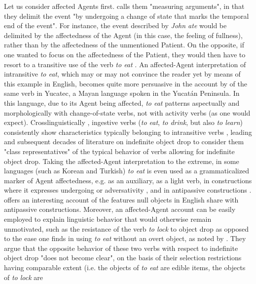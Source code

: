 Let us consider affected Agents first. \textcite[158]{tenny1994aspectual} calls them "measuring arguments", in that they delimit the event "by undergoing a change of state that marks the temporal end of the event". For instance, the event described by \textit{John ate} would be delimited by the affectedness of the Agent (in this case, the feeling of fullness), rather than by the affectedness of the unmentioned Patient. On the opposite, if one wanted to focus on the affectedness of the Patient, they would then have to resort to a transitive use of the verb \textit{to eat} \parencite[80]{Naess2007}. An affected-Agent interpretation of intransitive \textit{to eat}, which may or may not convince the reader yet by means of this example in English, becomes quite more persuasive in the account by \textcite[61-63]{Naess2007} of the same verb in Yucatec, a Mayan language spoken in the Yucatán Peninsula. In this language, due to its Agent being affected, \textit{to eat} patterns aspectually and morphologically with change-of-state verbs, not with activity verbs (as one would expect). Crosslinguistically \parencite[126]{Naess2007}, ingestive verbs (\textit{to eat}, \textit{to drink}, but also \textit{to learn}) consistently show characteristics typically belonging to intransitive verbs \parencite{Amberber2009}, leading \textcite{marantz1981nature} and subsequent decades of literature on indefinite object drop to consider them "class representatives" of the typical behavior of verbs allowing for indefinite object drop. Taking the affected-Agent interpretation to the extreme, in some languages (such as Korean and Turkish) \textit{to eat} is even used as a grammaticalized marker of Agent affectedness, e.g. as an auxiliary, as a light verb, in constructions where it expresses undergoing or adversativity \parencite[75]{Naess2007}, and in antipassive constructions \parencite[414]{Naess2011}.  \textcite{Nicolas2019} offers an interesting account of the features null objects in English share with antipassive constructions. Moreover, an affected-Agent account can be easily employed to explain linguistic behavior that would otherwise remain unmotivated, such as the resistance of the verb \textit{to lock} to object drop as opposed to the ease one finds in using \textit{to eat} without an overt object, as noted by \textcite[30]{PethoKardos2006}. They argue that the opposite behavior of these two verbs with respect to indefinite object drop "does not become clear", on the basis of their selection restrictions having comparable extent (i.e. the objects of \textit{to eat} are edible items, the objects of \textit{to lock} are 